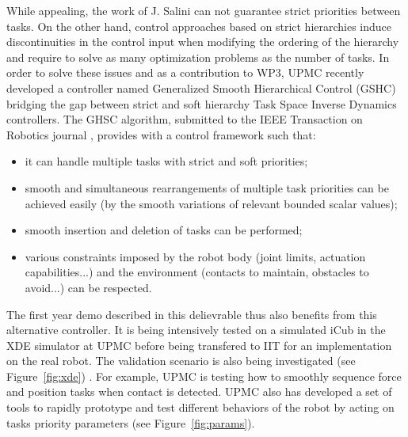 \documentclass[12pt,a4paper,twoside]{article}
\begin{document}
While appealing, the work of J. Salini can not guarantee strict priorities between tasks. On the other hand, control approaches based on strict hierarchies induce discontinuities in the control input when modifying the ordering of the hierarchy and require to solve as many optimization problems as the number of tasks. In order to solve these issues and as a contribution to WP3, UPMC recently developed a controller named Generalized Smooth Hierarchical Control (GSHC) bridging the gap between strict and soft hierarchy Task Space Inverse Dynamics controllers. The GHSC algorithm, submitted to the IEEE Transaction on Robotics journal \cite{liu2013}, provides with a control framework such that:
\begin{itemize}
	\item it can handle multiple tasks with strict and soft priorities;
	\item smooth and simultaneous rearrangements of multiple task priorities can be achieved easily (by the smooth variations of relevant bounded scalar values);
	\item smooth insertion and deletion of tasks can be performed;
	\item various constraints imposed by the robot body (joint limits, actuation capabilities...) and the environment (contacts to maintain, obstacles to avoid...) can be respected.
\end{itemize}

The first year demo described in this delievrable thus also benefits from this alternative controller. It is being intensively tested on a simulated iCub in the XDE simulator at UPMC before being transfered to IIT for an implementation on the real robot. The validation scenario is also being investigated (see Figure~\ref{fig:xde}) . For example, UPMC is testing how to smoothly sequence force and position tasks when contact is detected. UPMC also has developed a set of tools to rapidly prototype and test different behaviors of the robot by acting on tasks priority parameters (see Figure~\ref{fig:params}).
\end{document}
